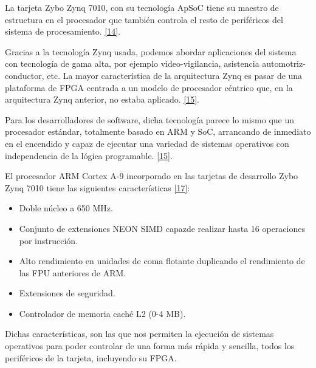 La tarjeta Zybo Zynq 7010, con su tecnología ApSoC tiene su maestro de estructura en el procesador que también controla el resto de periféricos del sistema de procesamiento. \hyperlink{14}{[14]}.



Gracias a la tecnología Zynq usada, podemos abordar aplicaciones del sistema con tecnología de gama alta, por ejemplo video-vigilancia, asistencia automotriz-conductor, etc. La mayor característica de la arquitectura Zynq es pasar de una plataforma de FPGA centrada a un modelo de procesador céntrico que, en la arquitectura Zynq anterior, no estaba aplicado. \hyperlink{15}{[15]}.

Para los desarrolladores de software, dicha tecnología parece lo mismo que un procesador estándar, totalmente basado en ARM y SoC, arrancando de inmediato en el encendido y capaz de ejecutar una variedad de sistemas operativos con independencia de la lógica programable. \hyperlink{15}{[15]}.

El procesador ARM Cortex A-9 incorporado en las tarjetas de desarrollo Zybo Zynq 7010 tiene las siguientes características \hyperlink{17}{[17]}:
\begin{itemize}
	\item Doble núcleo a 650 MHz.
	\item Conjunto de extensiones NEON SIMD capazde realizar hasta 16 operaciones por instrucción.
	\item Alto rendimiento en unidades de coma flotante duplicando el rendimiento de las FPU anteriores de ARM.
	\item Extensiones de seguridad.
	\item Controlador de memoria caché L2 (0-4 MB).
\end{itemize}

Dichas características, son las que nos permiten la ejecución de sistemas operativos para poder controlar de una forma más rápida y sencilla, todos los periféricos de la tarjeta, incluyendo su FPGA.